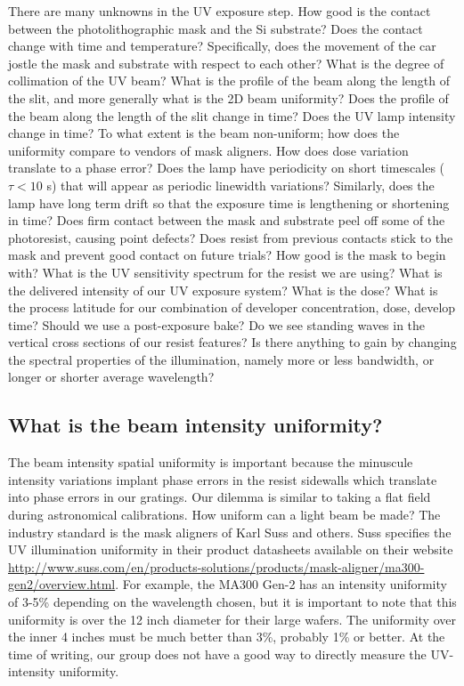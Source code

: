 There are many unknowns in the UV exposure step.  How good is the contact between the photolithographic mask and the Si substrate?  Does the contact change with time and temperature?  Specifically, does the movement of the car jostle the mask and substrate with respect to each other?  What is the degree of collimation of the UV beam?  What is the profile of the beam along the length of the slit, and more generally what is the 2D beam uniformity?  Does the profile of the beam along the length of the slit change in time?  Does the UV lamp intensity change in time?  To what extent is the beam non-uniform; how does the uniformity compare to vendors of mask aligners.  How does dose variation translate to a phase error?  Does the lamp have periodicity on short timescales ($\tau < 10 $ s) that will appear as periodic linewidth variations?  Similarly, does the lamp have long term drift so that the exposure time is lengthening or shortening in time?  Does firm contact between the mask and substrate peel off some of the photoresist, causing point defects?  Does resist from previous contacts stick to the mask and prevent good contact on future trials?  How good is the mask to begin with?  What is the UV sensitivity spectrum for the resist we are using?  What is the delivered intensity of our UV exposure system?  What is the dose?  What is the process latitude for our combination of developer concentration, dose, develop time?  Should we use a post-exposure bake?  Do we see standing waves in the vertical cross sections of our resist features?  Is there anything to gain by changing the spectral properties of the illumination, namely more or less bandwidth, or longer or shorter average wavelength?

\subsection{What is the beam intensity uniformity?}
The beam intensity spatial uniformity is important because the minuscule intensity variations implant phase errors in the resist sidewalls which translate into phase errors in our gratings.  Our dilemma is similar to taking a flat field during astronomical calibrations.  How uniform can a light beam be made?  The industry standard is the mask aligners of Karl Suss and others.  Suss specifies the UV illumination uniformity in their product datasheets available on their website \url{http://www.suss.com/en/products-solutions/products/mask-aligner/ma300-gen2/overview.html}.  For example, the MA300 Gen-2 has an intensity uniformity of 3-5\% depending on the wavelength chosen, but it is important to note that this uniformity is over the 12 inch diameter for their large wafers.  The uniformity over the inner 4 inches must be much better than 3\%, probably 1\% or better.  At the time of writing, our group does not have a good way to directly measure the UV-intensity uniformity.  

